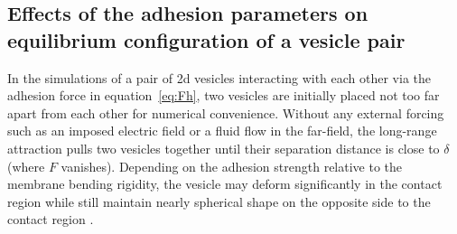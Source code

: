 \documentclass[aps,prl,twocolumn,showpacs,amsmath,amssymb]{revtex4-1}
\begin{document}
\subsection{Effects of the adhesion parameters on equilibrium configuration of a vesicle pair}
\label{subsec:qflow_adhesion_parameters} 
In the simulations of a pair of 2d vesicles interacting with each other via the adhesion force in equation~\ref{eq:Fh},
two vesicles are initially placed not too far apart  from each other for numerical convenience. 
Without any external forcing such as an imposed electric field or a fluid flow in the far-field, the long-range attraction pulls two vesicles together until their
separation distance is close to $\delta$ (where $F$ vanishes).  Depending on the adhesion strength relative to the membrane bending rigidity, the vesicle may deform significantly in the contact
region while still maintain nearly spherical shape on the opposite side to the contact region \cite{EvansMetcalfe1984_BJ,Book_PhysicalBasisCellAdhesion,Book_IntermolecularSurfaceForces,RamachandranAndersonLealIsraelachvili2010_Langmuir}.
\end{document}
